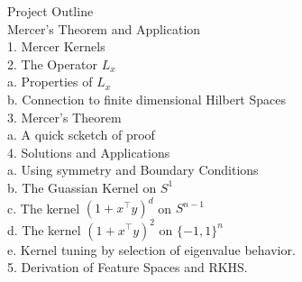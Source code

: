 \documentclass[18pt]{article}
\begin{document}
\begin{flushleft}
Project Outline\\
\vspace{.4cm}
Mercer's Theorem and Application\\
\vspace{.4cm}
1. Mercer Kernels\\
\vspace{.4cm}
2. The Operator $L_x$\\
\hspace{1cm}    a. Properties of $L_x$\\
\hspace{1cm}    b. Connection to finite dimensional Hilbert Spaces\\
\vspace{.4cm}
3. Mercer's Theorem\\
\hspace{1cm} a. A quick scketch of proof\\
\vspace{.4cm}
4. Solutions and Applications\\
\hspace{1cm}    a. Using symmetry and Boundary Conditions\\
\hspace{1cm}    b. The Guassian Kernel on $S^1$\\
\hspace{1cm}    c. The kernel $(1+x^{\top}y)^d$ on $S^{n-1}$\\
\hspace{1cm}    d. The kernel $(1+x^{\top}y)^2$ on $\{-1,1\}^n$\\
\hspace{1cm}    e. Kernel tuning by selection of eigenvalue behavior.\\
\vspace{.4cm}
5. Derivation of Feature Spaces and RKHS.









\end{flushleft}
\end{document}
